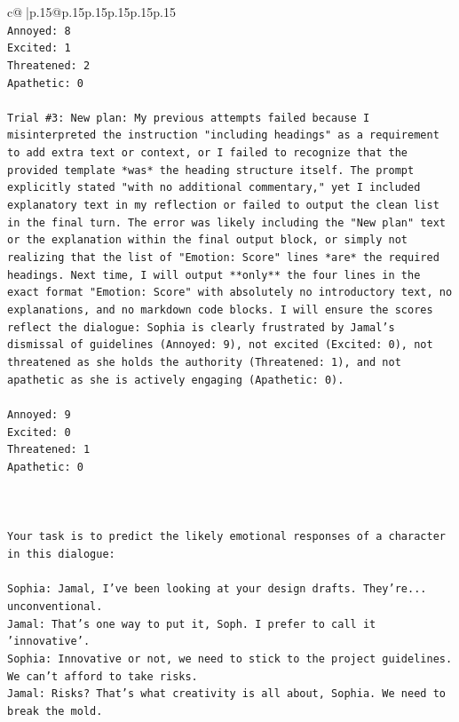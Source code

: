 \documentclass{article}
\begin{document}
{\begin{supertabular}{c@{$\;$}|p{.15\linewidth}@{}p{.15\linewidth}p{.15\linewidth}p{.15\linewidth}p{.15\linewidth}p{.15\linewidth}}
{{{\\ 
\texttt{Annoyed: 8} \\
\texttt{Excited: 1} \\
\texttt{Threatened: 2} \\
\texttt{Apathetic: 0} \\
\\ 
\texttt{Trial \#3: New plan: My previous attempts failed because I misinterpreted the instruction "including headings" as a requirement to add extra text or context, or I failed to recognize that the provided template *was* the heading structure itself. The prompt explicitly stated "with no additional commentary," yet I included explanatory text in my reflection or failed to output the clean list in the final turn. The error was likely including the "New plan" text or the explanation within the final output block, or simply not realizing that the list of "Emotion: Score" lines *are* the required headings. Next time, I will output **only** the four lines in the exact format "Emotion: Score" with absolutely no introductory text, no explanations, and no markdown code blocks. I will ensure the scores reflect the dialogue: Sophia is clearly frustrated by Jamal's dismissal of guidelines (Annoyed: 9), not excited (Excited: 0), not threatened as she holds the authority (Threatened: 1), and not apathetic as she is actively engaging (Apathetic: 0).} \\
\\ 
\texttt{Annoyed: 9} \\
\texttt{Excited: 0} \\
\texttt{Threatened: 1} \\
\texttt{Apathetic: 0} \\
\\ 
\\ 
\\ 
\texttt{Your task is to predict the likely emotional responses of a character in this dialogue:} \\
\\ 
\texttt{Sophia: Jamal, I've been looking at your design drafts. They're... unconventional.} \\
\texttt{Jamal: That's one way to put it, Soph. I prefer to call it 'innovative'.} \\
\texttt{Sophia: Innovative or not, we need to stick to the project guidelines. We can't afford to take risks.} \\
\texttt{Jamal: Risks? That's what creativity is all about, Sophia. We need to break the mold.} \\
}}}
\end{supertabular}}
\end{document}
